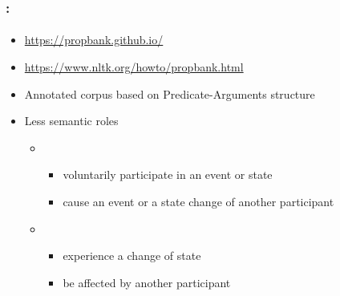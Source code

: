 \documentclass[xcolor=table]{beamer}
\begin{document}
\begin{frame}
	\frametitle{\insertshortsubtitle: \insertsection}
	\framesubtitle{\insertsubsection}

	
	\begin{itemize}
		\item {\scriptsize \url{https://propbank.github.io/}}
		\item {\scriptsize \url{https://www.nltk.org/howto/propbank.html}}
		\item Annotated corpus based on Predicate-Arguments structure
		\item Less semantic roles 
		\begin{itemize}
			\item {}
			\begin{itemize}
				\item voluntarily participate in an event or state
				\item cause an event or a state change of another participant
			\end{itemize}
			\item {}
			\begin{itemize}
				\item experience a change of state
				\item be affected by another participant
			\end{itemize}
		\end{itemize}
	\end{itemize}
	
\end{frame}
\end{document}
